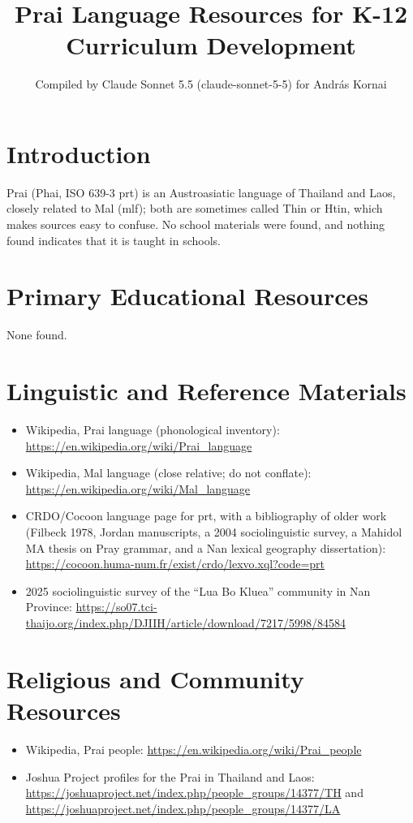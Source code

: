 \documentclass[12pt]{article}
\title{Prai Language Resources for K-12 Curriculum Development}
\author{Compiled by Claude Sonnet 5.5 (claude-sonnet-5-5) for Andr\'as Kornai}
\date{}
\begin{document}
\maketitle

\section{Introduction}
Prai (Phai, ISO 639-3 prt) is an Austroasiatic language of Thailand and Laos, closely related to Mal (mlf); both are sometimes called Thin or Htin, which makes sources easy to confuse. No school materials were found, and nothing found indicates that it is taught in schools.

\section{Primary Educational Resources}
None found.

\section{Linguistic and Reference Materials}
\begin{itemize}
\item Wikipedia, Prai language (phonological inventory): \url{https://en.wikipedia.org/wiki/Prai_language}
\item Wikipedia, Mal language (close relative; do not conflate): \url{https://en.wikipedia.org/wiki/Mal_language}
\item CRDO/Cocoon language page for prt, with a bibliography of older work (Filbeck 1978, Jordan manuscripts, a 2004 sociolinguistic survey, a Mahidol MA thesis on Pray grammar, and a Nan lexical geography dissertation): \url{https://cocoon.huma-num.fr/exist/crdo/lexvo.xql?code=prt}
\item 2025 sociolinguistic survey of the ``Lua Bo Kluea'' community in Nan Province: \url{https://so07.tci-thaijo.org/index.php/DJIIH/article/download/7217/5998/84584}
\end{itemize}

\section{Religious and Community Resources}
\begin{itemize}
\item Wikipedia, Prai people: \url{https://en.wikipedia.org/wiki/Prai_people}
\item Joshua Project profiles for the Prai in Thailand and Laos: \url{https://joshuaproject.net/index.php/people_groups/14377/TH} and \url{https://joshuaproject.net/index.php/people_groups/14377/LA}
\end{itemize}
\end{document}
